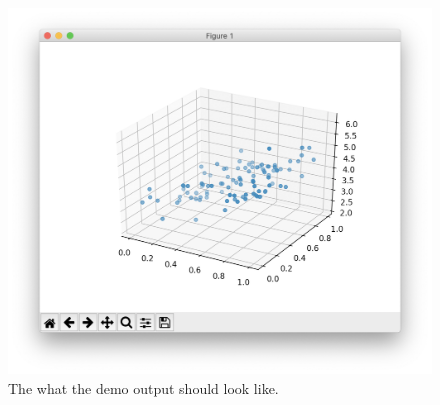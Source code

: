 \documentclass{article} %
\begin{document}
\begin{figure}
\begin{center}
\includegraphics[height=0.5\textheight]{test-plot}
\caption{The what the demo output should look like.}
\label{test-plot-fig}
\end{center}
\end{figure}
\end{document}
